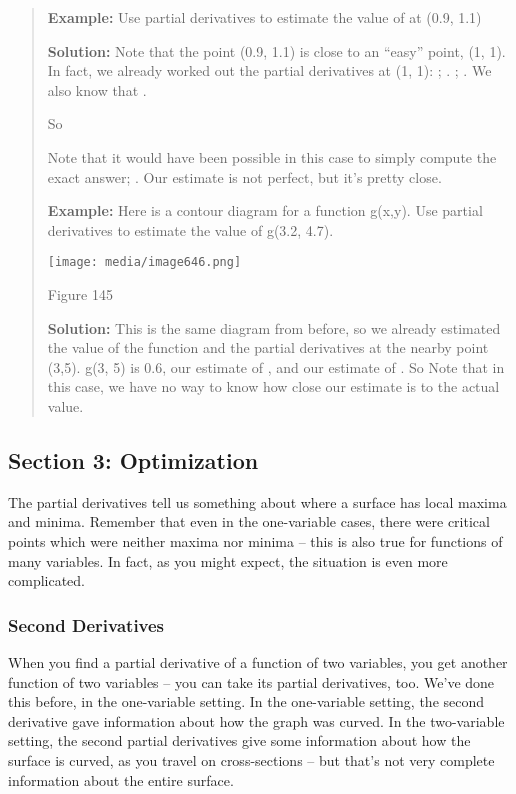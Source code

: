 \begin{quote}
\textbf{Example:} Use partial derivatives to estimate the value of at
(0.9, 1.1)

\textbf{Solution:} Note that the point (0.9, 1.1) is close to an
``easy'' point, (1, 1). In fact, we already worked out the partial
derivatives at (1, 1): ; . ; . We also know that .

So

Note that it would have been possible in this case to simply compute the
exact answer; . Our estimate is not perfect, but it's pretty close.

\textbf{Example:} Here is a contour diagram for a function g(x,y). Use
partial derivatives to estimate the value of g(3.2, 4.7).

\texttt{[image: media/image646.png]}

Figure 145

\textbf{Solution:} This is the same diagram from before, so we already
estimated the value of the function and the partial derivatives at the
nearby point (3,5). g(3, 5) is 0.6, our estimate of , and our estimate
of . So Note that in this case, we have no way to know how close our
estimate is to the actual value.
\end{quote}

\subsection{}\label{section-8}

\hypertarget{section-3-optimization}{\subsection{Section 3:
Optimization}\label{section-3-optimization}}

The partial derivatives tell us something about where a surface has
local maxima and minima. Remember that even in the one-variable cases,
there were critical points which were neither maxima nor minima -- this
is also true for functions of many variables. In fact, as you might
expect, the situation is even more complicated.

\subsubsection{Second Derivatives}\label{second-derivatives}

When you find a partial derivative of a function of two variables, you
get another function of two variables -- you can take its partial
derivatives, too. We've done this before, in the one-variable setting.
In the one-variable setting, the second derivative gave information
about how the graph was curved. In the two-variable setting, the second
partial derivatives give some information about how the surface is
curved, as you travel on cross-sections -- but that's not very complete
information about the entire surface.

